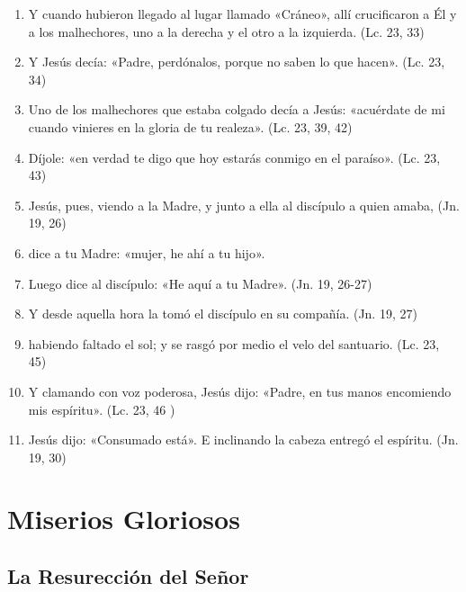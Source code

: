 \documentclass[a4paper,11pt]{article}
\begin{document}
      \begin{enumerate}
        \item Y cuando hubieron llegado al lugar llamado «Cráneo», allí crucificaron a Él y a los malhechores, uno a la derecha y el otro a la izquierda. (Lc. 23, 33)

        \item Y Jesús decía: «Padre, perdónalos, porque no saben lo que hacen». (Lc. 23, 34)

        \item Uno de los malhechores que estaba colgado decía a Jesús: «acuérdate de mi cuando vinieres en la gloria de tu realeza». (Lc. 23, 39, 42)

        \item Díjole: «en verdad te digo que hoy estarás conmigo en el paraíso». (Lc. 23, 43)

        \item Jesús, pues, viendo a la Madre, y junto a ella al discípulo a quien amaba, (Jn. 19, 26)

        \item dice a tu Madre: «mujer, he ahí a tu hijo». \item Luego dice al discípulo: «He aquí a tu Madre». (Jn. 19, 26-27)

        \item Y desde aquella hora la tomó el discípulo en su compañía. (Jn. 19, 27)

        \item habiendo faltado el sol; y se rasgó por medio el velo del santuario. (Lc. 23, 45)

        \item Y clamando con voz poderosa, Jesús dijo: «Padre, en tus manos encomiendo mis espíritu». (Lc. 23, 46 )

        \item Jesús dijo: «Consumado está». E inclinando la cabeza entregó el espíritu. (Jn. 19, 30)

      \end{enumerate}

    \newpage
         
  \section*{\hfil Miserios Gloriosos \hfil}
    \subsection*{\hfil La Resurección del Señor \hfil}
      
\end{document}
